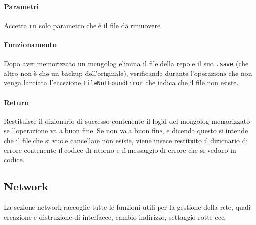 \documentclass[11pt]{article}
\begin{document}
\paragraph{Parametri}
Accetta un solo parametro che è il file da rimuovere.
\paragraph{Funzionamento}
Dopo aver memorizzato un mongolog elimina il file della repo e il suo \texttt{.save} (che altro non è che un backup
dell'originale), verificando durante l'operazione che non venga lanciata l'eccezione \texttt{FileNotFoundError}
che indica che il file non esiste.
\paragraph{Return}
Restituisce il dizionario di successo contenente il logid del mongolog memorizzato se l'operazione va a buon fine.
Se non va a buon fine, e dicendo questo si intende che il file che si vuole cancellare non esiste, viene invece
restituito il dizionario di errore contenente il codice di ritorno e il messaggio di errore che si vedono in codice.



\subsection{Network}\label{network}
La sezione network raccoglie tutte le funzioni utili per la gestione della rete, quali creazione e distruzione
di interfacce, cambio indirizzo, settaggio rotte ecc.
\end{document}
